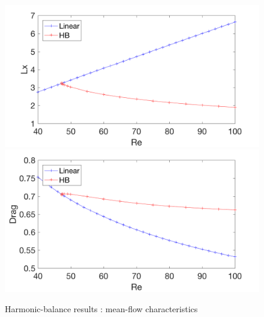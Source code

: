 \documentclass[twocolumn,10pt]{asme2ej}
\begin{document}
\begin{figure}
\begin{center}
\includegraphics[width=.9 \linewidth]{Cylinder_Lx_Re_HB.png}
\includegraphics[width=.9 \linewidth]{Cylinder_Drag_Re_HB.png}
\end{center}
\caption{Harmonic-balance results : mean-flow characteristics}
\label{fig:HB}
\end{figure}
\end{document}
